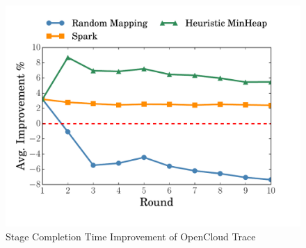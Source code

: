 \begin{figure}
	\centering
	\includegraphics[width=0.75\linewidth]{fig/sim} %
	\caption{Stage Completion Time Improvement of OpenCloud Trace}
	\label{fig:sim}
\end{figure}



